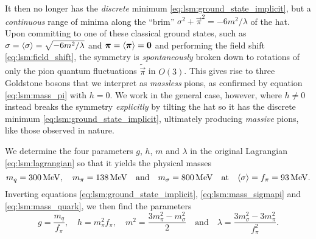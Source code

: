 It then no longer has the \emph{discrete} minimum \eqref{eq:lsm:ground_state_implicit}, but a \emph{continuous} range of minima along the ``brim'' $\sigma^2 + \vec{\pi}^2 = -6m^2/\lambda$ of the hat.
Upon committing to one of these classical ground states, such as $\sigma=\langle \sigma \rangle=\sqrt{-6m^2/\lambda}$ and ${\bm{\pi}}=\langle {\bm{\pi}} \rangle={\bm{0}}$ and performing the field shift \eqref{eq:lsm:field_shift},
the symmetry is \emph{spontaneously} broken down to rotations of only the pion quantum fluctuations $\tilde{\vec{\pi}}$ in $O(3)$.
This gives rise to three Goldstone bosons that we interpret as \emph{massless} pions, as confirmed by equation \eqref{eq:lsm:mass_pi} with $h = 0$.
We work in the general case, however, where $h \neq 0$ instead breaks the symmetry \emph{explicitly} by tilting the hat so it has the discrete minimum \eqref{eq:lsm:ground_state_implicit}, ultimately producing \emph{massive} pions, like those observed in nature.

We determine the four parameters $g$, $h$, $m$ and $\lambda$ in the original Lagrangian \eqref{eq:lsm:lagrangian} so that it yields the physical masses
\cite{ref:jo_lsm_consistent_chiral}
\begin{equation}
	m_q = \SI{300}{\mega\electronvolt}, \quad
	m_\pi = \SI{138}{\mega\electronvolt} \quad \text{and} \quad
	m_\sigma = \SI{800}{\mega\electronvolt} \quad \text{at} \quad
	\langle \sigma \rangle = f_\pi = \SI{93}{\mega\electronvolt}.
\end{equation}
Inverting equations \eqref{eq:lsm:ground_state_implicit}, \eqref{eq:lsm:mass_sigmapi} and \eqref{eq:lsm:mass_quark}, we then find the parameters
\begin{equation}
	g       = \frac{m_q}{f_\pi}, \quad %
	h       = m_\pi^2 f_\pi, \quad %
	m^2     = \frac{3m_\pi^2 - m_\sigma^2}{2} \quad \text{and} \quad %
	\lambda = \frac{3 m_\sigma^2 - 3 m_\pi^2}{f_\pi^2} .    %
\label{eq:lsm:parameters}
\end{equation}

